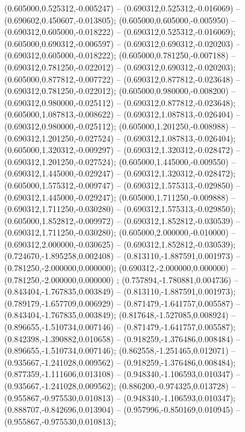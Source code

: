  (0.605000,0.525312,-0.005247) -- (0.690312,0.525312,-0.016069) -- (0.690602,0.450607,-0.013805);
 (0.605000,0.605000,-0.005950) -- (0.690312,0.605000,-0.018222) -- (0.690312,0.525312,-0.016069);
 (0.605000,0.690312,-0.006597) -- (0.690312,0.690312,-0.020203) -- (0.690312,0.605000,-0.018222);
 (0.605000,0.781250,-0.007188) -- (0.690312,0.781250,-0.022012) -- (0.690312,0.690312,-0.020203);
 (0.605000,0.877812,-0.007722) -- (0.690312,0.877812,-0.023648) -- (0.690312,0.781250,-0.022012);
 (0.605000,0.980000,-0.008200) -- (0.690312,0.980000,-0.025112) -- (0.690312,0.877812,-0.023648);
 (0.605000,1.087813,-0.008622) -- (0.690312,1.087813,-0.026404) -- (0.690312,0.980000,-0.025112);
 (0.605000,1.201250,-0.008988) -- (0.690312,1.201250,-0.027524) -- (0.690312,1.087813,-0.026404);
 (0.605000,1.320312,-0.009297) -- (0.690312,1.320312,-0.028472) -- (0.690312,1.201250,-0.027524);
 (0.605000,1.445000,-0.009550) -- (0.690312,1.445000,-0.029247) -- (0.690312,1.320312,-0.028472);
 (0.605000,1.575312,-0.009747) -- (0.690312,1.575313,-0.029850) -- (0.690312,1.445000,-0.029247);
 (0.605000,1.711250,-0.009888) -- (0.690312,1.711250,-0.030280) -- (0.690312,1.575313,-0.029850);
 (0.605000,1.852812,-0.009972) -- (0.690312,1.852812,-0.030539) -- (0.690312,1.711250,-0.030280);
 (0.605000,2.000000,-0.010000) -- (0.690312,2.000000,-0.030625) -- (0.690312,1.852812,-0.030539);
 (0.724670,-1.895258,0.002408) -- (0.813110,-1.887591,0.001973) -- (0.781250,-2.000000,0.000000);
 (0.690312,-2.000000,0.000000) -- (0.781250,-2.000000,0.000000) ;
 (0.757894,-1.780881,0.004736) -- (0.843404,-1.767835,0.003849) -- (0.813110,-1.887591,0.001973);
 (0.789179,-1.657709,0.006929) -- (0.871479,-1.641757,0.005587) -- (0.843404,-1.767835,0.003849);
 (0.817648,-1.527085,0.008924) -- (0.896655,-1.510734,0.007146) -- (0.871479,-1.641757,0.005587);
 (0.842398,-1.390882,0.010658) -- (0.918259,-1.376486,0.008484) -- (0.896655,-1.510734,0.007146);
 (0.862558,-1.251465,0.012071) -- (0.935667,-1.241028,0.009562) -- (0.918259,-1.376486,0.008484);
 (0.877359,-1.111606,0.013108) -- (0.948340,-1.106593,0.010347) -- (0.935667,-1.241028,0.009562);
 (0.886200,-0.974325,0.013728) -- (0.955867,-0.975530,0.010813) -- (0.948340,-1.106593,0.010347);
 (0.888707,-0.842696,0.013904) -- (0.957996,-0.850169,0.010945) -- (0.955867,-0.975530,0.010813);

